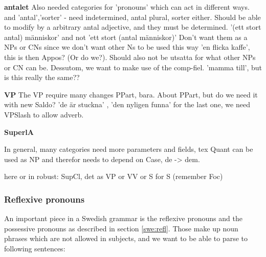 \documentclass{report}
\begin{document}
\textbf{antalet}
Also needed categories for 'pronouns' which can act in different ways.
and 'antal','sorter' - need indetermined, antal plural, sorter either.
Should be able to modify by a arbitrary antal adjective, and they must be determined.
'(ett stort antal) människor' and not 'ett stort (antal människor)'
Don't want them as a NPs or CNs since we don't want other Ns to be used this way
'en flicka kaffe', this is then Appos? (Or do we?). Should also not be utsatta for what other
NPs or CN can be. Dessutom, we want to make use of the comp-fiel. 'mamma till', but is this really
the same??

\textbf{VP}
The VP require many changes PPart, bara.
About PPart, but do we need it with new Saldo? 'de är stuckna' , 'den nyligen funna'
for the last one, we need VPSlash to allow adverb.

\textbf{SuperlA}

In general, many categories need more parameters and fields, tex Quant can be used as NP
and therefor needs to depend on Case, de -> dem.

here or in robust: SupCl, det as VP or VV or S for S (remember Foc)
\subsubsection{Reflexive pronouns}
An important piece in a Swedish grammar is the reflexive pronouns and
the possessive pronouns as described in section \ref{swe:refl}.
Those make up noun phrases which are not allowed in subjects, 
and we want to be able to parse to following sentences:
\end{document}

